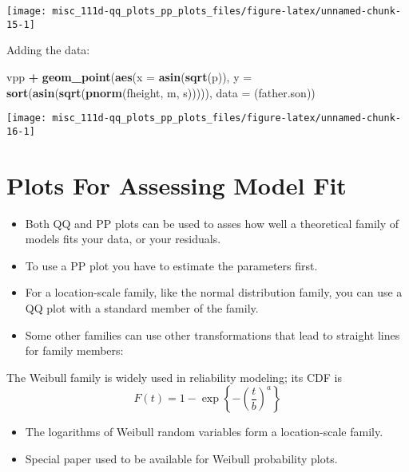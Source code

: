 \documentclass[]{book}
\newenvironment{Shaded}{\begin{snugshade}}{\end{snugshade}}
\newcommand{\DataTypeTok}[1]{\textcolor[rgb]{0.13,0.29,0.53}{#1}}
\newcommand{\KeywordTok}[1]{\textcolor[rgb]{0.13,0.29,0.53}{\textbf{#1}}}
\newcommand{\NormalTok}[1]{#1}
\newcommand{\OperatorTok}[1]{\textcolor[rgb]{0.81,0.36,0.00}{\textbf{#1}}}
\begin{document}
\begin{center}\texttt{[image: misc\_111d-qq\_plots\_pp\_plots\_files/figure-latex/unnamed-chunk-15-1]} \end{center}

Adding the data:

\begin{Shaded}
\begin{Highlighting}[]
\NormalTok{vpp }\OperatorTok{+}
\KeywordTok{geom_point}\NormalTok{(}\KeywordTok{aes}\NormalTok{(}\DataTypeTok{x =} \KeywordTok{asin}\NormalTok{(}\KeywordTok{sqrt}\NormalTok{(p)), }\DataTypeTok{y =} \KeywordTok{sort}\NormalTok{(}\KeywordTok{asin}\NormalTok{(}\KeywordTok{sqrt}\NormalTok{(}\KeywordTok{pnorm}\NormalTok{(fheight, m, s))))),}
           \DataTypeTok{data =}\NormalTok{ (father.son))}
\end{Highlighting}
\end{Shaded}

\begin{center}\texttt{[image: misc\_111d-qq\_plots\_pp\_plots\_files/figure-latex/unnamed-chunk-16-1]} \end{center}

\hypertarget{plots-for-assessing-model-fit}{%
\section{Plots For Assessing Model Fit}\label{plots-for-assessing-model-fit}}

\begin{itemize}
\item
  Both QQ and PP plots can be used to asses how well a theoretical family of models fits your data, or your residuals.
\item
  To use a PP plot you have to estimate the parameters first.
\item
  For a location-scale family, like the normal distribution family, you can use a QQ plot with a standard member of the family.
\item
  Some other families can use other transformations that lead to straight lines for family members:
\end{itemize}

The Weibull family is widely used in reliability modeling; its CDF is
\[F(t) = 1 - \exp\left\{-\left(\frac{t}{b}\right)^a\right\}\]

\begin{itemize}
\item
  The logarithms of Weibull random variables form a location-scale family.
\item
  Special paper used to be available for Weibull probability plots.
\end{itemize}
\end{document}
